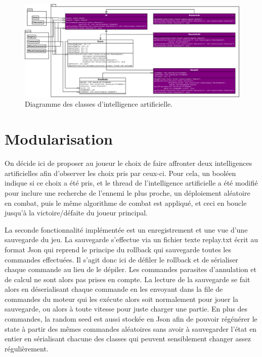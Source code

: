 \documentclass[a4paper,12pt]{article}
\begin{document}
\begin{landscape}
    \begin{figure}[p]
        \centering
        \includegraphics[width=0.9\paperheight,keepaspectratio]{ai.png}
        \caption{\label{uml:ai}Diagramme des classes d'intelligence artificielle.}
    \end{figure}
\end{landscape}


\section{Modularisation}
\label{sec:module}

On décide ici de proposer au joueur le choix de faire affronter deux intelligences artificielles afin d'observer les choix pris par ceux-ci. Pour cela, un booléen indique si ce choix a été pris, et le thread de l'intelligence artificielle a été modifié pour inclure une recherche de l'ennemi le plus proche, un déploiement aléatoire en combat, puis le même algorithme de combat est appliqué, et ceci en boucle jusqu'à la victoire/défaite du joueur principal.

La seconde fonctionnalité implémentée est un enregistrement et une vue d'une sauvegarde du jeu. La sauvegarde s'effectue via un fichier texte replay.txt écrit au format Json qui reprend le principe du rollback qui sauvegarde toutes les commandes effectuées. Il s'agit donc ici de défiler le rollback et de sérialiser chaque commande au lieu de le dépiler. Les commandes parasites d'annulation et de calcul ne sont alors pas prises en compte. La lecture de la sauvegarde se fait alors en déserialisant chaque commande en les envoyant dans la file de commandes du moteur qui les exécute alors soit normalement pour jouer la sauvegarde, ou alors à toute vitesse pour juste charger une partie. En plus des commandes, la random seed est aussi stockée en Json afin de pouvoir régénérer le state à partir des mêmes commandes aléatoires sans avoir à sauvegarder l'état en entier en sérialisant chacune des classes qui peuvent sensiblement changer assez régulièrement.
\end{document}

